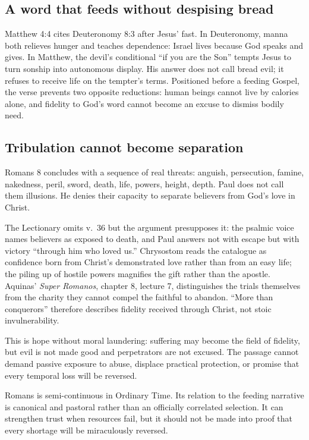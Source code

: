\subsection*{A word that feeds without despising bread\enspace{}}
Matthew 4:4 cites Deuteronomy 8:3 after Jesus' fast. In Deuteronomy, manna
both relieves hunger and teaches dependence: Israel lives because God speaks
and gives. In Matthew, the devil's conditional ``if you are the Son'' tempts
Jesus to turn sonship into autonomous display. His answer does not call bread
evil; it refuses to receive life on the tempter's terms. Positioned before a
feeding Gospel, the verse prevents two opposite reductions: human beings
cannot live by calories alone, and fidelity to God's word cannot become an
excuse to dismiss bodily need.

\subsection*{Tribulation cannot become separation\enspace{}}
Romans 8 concludes with a sequence of real threats: anguish, persecution, famine, nakedness, peril, sword, death, life, powers, height, depth. Paul does not call them illusions. He denies their capacity to separate believers from God's love in Christ.

The Lectionary omits v.~36 but the argument presupposes it: the psalmic voice
names believers as exposed to death, and Paul answers not with escape but
with victory ``through him who loved us.'' Chrysostom reads the catalogue as
confidence born from Christ's demonstrated love rather than from an easy
life; the piling up of hostile powers magnifies the gift rather than the
apostle. Aquinas' \emph{Super Romanos}, chapter 8, lecture 7, distinguishes
the trials themselves from the charity they cannot compel the faithful to
abandon. ``More than conquerors'' therefore describes fidelity received
through Christ, not stoic invulnerability.

This is hope without moral laundering: suffering may become the field of
fidelity, but evil is not made good and perpetrators are not excused. The
passage cannot demand passive exposure to abuse, displace practical
protection, or promise that every temporal loss will be reversed.

Romans is semi-continuous in Ordinary Time. Its relation to the feeding narrative is canonical and pastoral rather than an officially correlated selection. It can strengthen trust when resources fail, but it should not be made into proof that every shortage will be miraculously reversed.

